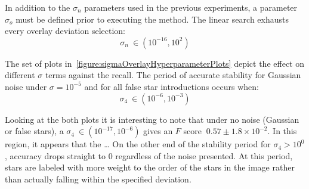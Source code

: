 In addition to the $\sigma_n$ parameters used in the previous experiments, a parameter $\sigma_o$ must be defined
prior to executing the  method.
The linear search exhausts every overlay deviation selection:
\begin{equation}
    \label{eq:linearSearchSigmaOverlay}
    \sigma_n \ \in (10^{-16}, 10^{2})
\end{equation}

\begin{figure}
\end{figure}

The set of plots in~\autoref{figure:sigmaOverlayHyperparameterPlots} depict the effect on different $\sigma$ terms
against the recall.
The period of accurate stability for Gaussian noise under $\sigma = 10^{-5}$ and for all false star introductions occurs
when:
\begin{equation}
    \label{eq:sigmaOverlayStableRegion}
    \sigma_4 \ \in (10^{-6}, 10^{-3})
\end{equation}

Looking at the both plots it is interesting to note that under no noise (Gaussian or false stars), a $\sigma_4 \ \in
(10^{-17}, 10^{-6})$ gives an $F$ score $~0.57 \pm 1.8 \times 10^{-2}$.
In this region, it appears that the \ldots
On the other end of the stability period for $\sigma_4 > 10^0$, accuracy drops straight to 0 regardless of the noise
presented.
At this period, stars are labeled with more weight to the order of the stars in the image rather than actually falling
within the specified deviation.

